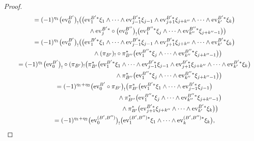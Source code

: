 \documentclass[pdftex]{sigma}
\numberwithin{equation}{section}
\theoremstyle{definition}
\begin{document}
\begin{proof}
\begin{gather*}
\qquad{} =  (-1)^{\eta_1}
\bigl({\rm ev}_0^{B'}\bigr)_! \bigl( \bigl( {\rm ev}_1^{B'*}\xi_1 \wedge \dots \wedge {\rm ev}_{j-1}^{B'*} \xi_{j-1} \wedge {\rm ev}_{j+1}^{B'*} \xi_{j+k''} \wedge \dots \wedge {\rm ev}_{k'}^{B'*} \xi_k \bigr)  \\
\hphantom{=(-1)^{\eta_1}\bigl({\rm ev}_0^{B'}\bigr)_! \bigl(}\qquad{}
  \wedge {\rm ev}_j^{B'*} \circ \bigl({\rm ev}_0^{B''}\bigr)_! \bigl({\rm ev}_1^{B''*} \xi_j \wedge \dots \wedge {\rm ev}_{k''}^{B''*} \xi_{j+k''-1} \bigr)\bigr)   \\
\qquad{} =  (-1)^{\eta_1}
\bigl({\rm ev}_0^{B'}\bigr)_! \bigl( \bigl( {\rm ev}_1^{B'*}\xi_1 \wedge \dots \wedge {\rm ev}_{j-1}^{B'*} \xi_{j-1} \wedge {\rm ev}_{j+1}^{B'*} \xi_{j+k''} \wedge \dots \wedge {\rm ev}_{k'}^{B'*} \xi_k \bigr)  \\
\hphantom{=(-1)^{\eta_1}\bigl({\rm ev}_0^{B'}\bigr)_! \bigl(}\qquad{}
  \wedge (\pi_{B'})_! \circ \pi_{B''}^* \bigl({\rm ev}_1^{B''*} \xi_j \wedge \dots \wedge {\rm ev}_{k''}^{B''*} \xi_{j+k''-1} \bigr)\bigr)  \\
\qquad{} =  (-1)^{\eta_1}
\bigl({\rm ev}_0^{B'}\bigr)_! \circ (\pi_{B'})_! \bigl( \pi_{B'}^* \bigl({\rm ev}_1^{B'*}\xi_1 \wedge \dots \wedge {\rm ev}_{j-1}^{B'*} \xi_{j-1} \wedge {\rm ev}_{j+1}^{B'*} \xi_{j+k''} \wedge \dots \wedge {\rm ev}_{k'}^{B'*} \xi_k\bigr)  \\
\hphantom{=  (-1)^{\eta_1}\bigl({\rm ev}_0^{B'}\bigr)_! \circ (\pi_{B'})_! \bigl(}\qquad{}
  \wedge \pi_{B''}^* \bigl({\rm ev}_1^{B''*} \xi_j \wedge \dots \wedge {\rm ev}_{k''}^{B''*} \xi_{j+k''-1} \bigr) \bigr)  \\
\qquad{} =  (-1)^{\eta_1 + \eta_2}
\bigl({\rm ev}_0^{B'} \circ \pi_{B'}\bigr)_! \bigl( \pi_{B'}^* \bigl({\rm ev}_1^{B'*}\xi_1 \wedge \dots \wedge {\rm ev}_{j-1}^{B'*} \xi_{j-1} \bigr)
 \\
\hphantom{=  (-1)^{\eta_1 + \eta_2}\bigl({\rm ev}_0^{B'} \circ \pi_{B'}\bigr)_! \bigl(}\qquad{}
  \wedge \pi_{B''}^* \bigl({\rm ev}_1^{B''*} \xi_j \wedge \dots \wedge {\rm ev}_{k''}^{B''*} \xi_{j+k''-1} \bigr) \\
\hphantom{=  (-1)^{\eta_1 + \eta_2}\bigl({\rm ev}_0^{B'} \circ \pi_{B'}\bigr)_! \bigl(}\qquad{}
  \wedge \pi_{B'}^* \bigl( {\rm ev}_{j+1}^{B'*} \xi_{j+k''} \wedge \dots \wedge {\rm ev}_{k'}^{B'*} \xi_k \bigr)\bigr) \\
\qquad{} =  (-1)^{\eta_1 + \eta_2}
\bigl({\rm ev}_0^{(B',B'')}\bigr)_! \bigl({\rm ev}_1^{(B',B'') *} \xi_1 \wedge \dots \wedge {\rm ev}_k^{(B',B'') *} \xi_k\bigr),
\end{gather*}

\end{proof}
\end{document}
